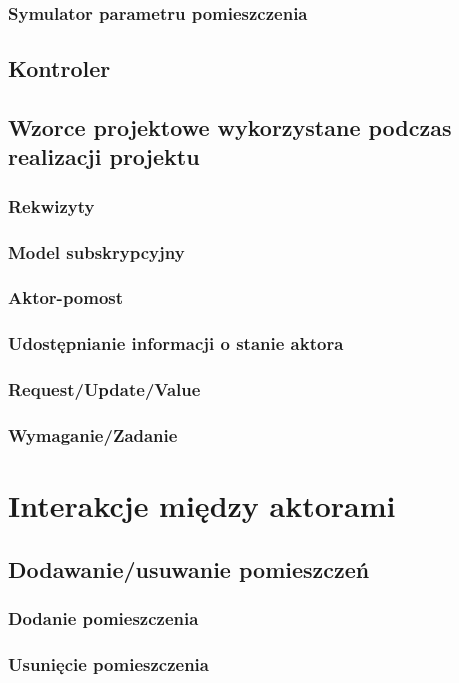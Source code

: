 \subsection{Symulator parametru pomieszczenia}
\section{Kontroler}

\section{Wzorce projektowe wykorzystane podczas realizacji projektu}
\subsection{Rekwizyty}
\subsection{Model subskrypcyjny}
\subsection{Aktor-pomost}
\subsection{Udostępnianie informacji o stanie aktora}
\subsection{Request/Update/Value}
\subsection{Wymaganie/Zadanie}


\chapter{Interakcje między aktorami}

\section{Dodawanie/usuwanie pomieszczeń}
\subsection*{Dodanie pomieszczenia}
\subsection*{Usunięcie pomieszczenia}

